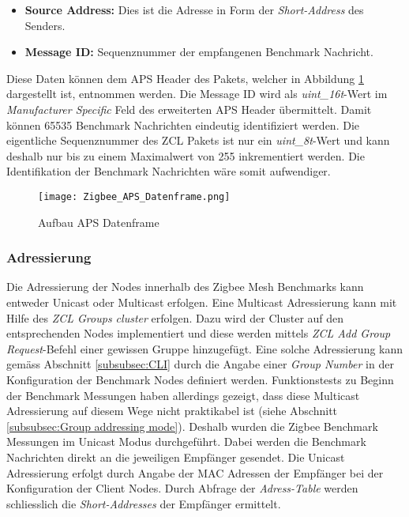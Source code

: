 \begin{itemize}
\item \textbf{Source Address:} Dies ist die Adresse in Form der \textit{Short-Address} des Senders.
\item \textbf{Message ID:} Sequenznummer der empfangenen Benchmark Nachricht.
\end{itemize}

Diese Daten können dem APS Header des Pakets, welcher in Abbildung \ref{fig:AufbauAPSDatenframe} dargestellt ist, entnommen werden.
Die Message ID wird als \textit{uint\_16t}-Wert im \textit{Manufacturer Specific} Feld des erweiterten APS Header übermittelt.
Damit können 65535 Benchmark Nachrichten eindeutig identifiziert werden.
Die eigentliche Sequenznummer des ZCL Pakets ist nur ein \textit{uint\_8t}-Wert und kann deshalb nur bis zu einem Maximalwert von 255 inkrementiert werden.
Die Identifikation der Benchmark Nachrichten wäre somit aufwendiger.

\begin{figure}[h]
	\centering
	\texttt{[image: Zigbee\_APS\_Datenframe.png]}
	\caption{Aufbau APS Datenframe \cite{markus_krause_rainer_konrad_drahtlose_2014}}
	\label{fig:AufbauAPSDatenframe}
\end{figure}


\subsubsection{Adressierung}\label{subsubsec:Adressierung}
Die Adressierung der Nodes innerhalb des Zigbee Mesh Benchmarks kann entweder Unicast oder Multicast erfolgen.
Eine Multicast Adressierung kann mit Hilfe des \textit{ZCL Groups cluster} erfolgen.
Dazu wird der Cluster auf den entsprechenden Nodes implementiert und diese werden mittels \textit{ZCL Add Group Request}-Befehl einer gewissen Gruppe hinzugefügt.
Eine solche Adressierung kann gemäss Abschnitt \ref{subsubsec:CLI} durch die Angabe einer \textit{Group Number} in der Konfiguration der Benchmark Nodes definiert werden.
Funktionstests zu Beginn der Benchmark Messungen haben allerdings gezeigt, dass diese Multicast Adressierung auf diesem Wege nicht praktikabel ist (siehe Abschnitt \ref{subsubsec:Group addressing mode}).
Deshalb wurden die Zigbee Benchmark Messungen im Unicast Modus durchgeführt.
Dabei werden die Benchmark Nachrichten direkt an die jeweiligen Empfänger gesendet.
Die Unicast Adressierung erfolgt durch Angabe der MAC Adressen der Empfänger bei der Konfiguration der Client Nodes.
Durch Abfrage der \textit{Adress-Table} werden schliesslich die \textit{Short-Addresses} der Empfänger ermittelt.


